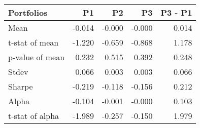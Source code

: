 \begin{tabular}{lrrrr}
\toprule
Portfolios & P1 & P2 & P3 & P3 - P1 \\
\midrule
Mean & -0.014 & -0.000 & -0.000 & 0.014 \\
t-stat of mean & -1.220 & -0.659 & -0.868 & 1.178 \\
p-value of mean & 0.232 & 0.515 & 0.392 & 0.248 \\
Stdev & 0.066 & 0.003 & 0.003 & 0.066 \\
Sharpe & -0.219 & -0.118 & -0.156 & 0.212 \\
Alpha & -0.104 & -0.001 & -0.000 & 0.103 \\
t-stat of alpha & -1.989 & -0.257 & -0.150 & 1.979 \\
\bottomrule
\end{tabular}
